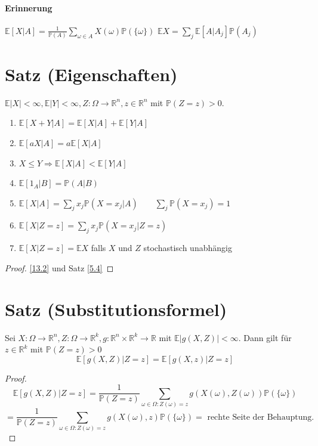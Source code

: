 \documentclass[a4paper,11pt,notitlepage]{report}
\newcommand{\R}{{\ensuremath{\mathbb{R}}}}
\newcommand{\Prim}{{\ensuremath{\mathbb{P}}}}
\newcommand{\E}{{\ensuremath{\mathbb{E}}}}
\begin{document}
\paragraph{Erinnerung}
$\E [X | A] = \frac{1}{\Prim(A)} \sum\limits_{\omega \in A}{X(\omega) \Prim(\{\omega\})}$
\newline
$\E X = \sum\limits_{j}{\E [A|A_j] \Prim(A_j)}$

\section{Satz (Eigenschaften)}
\label{13.6}
$\E |X| < \infty, \E |Y| < \infty, Z \colon \Omega \rightarrow \R^n, z \in \R^n$ mit $\Prim(Z=z)>0$.
\begin{enumerate}
	\item $\E [X+Y | A] = \E [X|A] + \E[Y | A]$
	\item $\E [aX | A] = a \E [X|A]$
	\item $X \leq Y \Rightarrow \E [X|A] < \E [Y|A]$
	\item $\E [1_A | B] = \Prim(A|B)$
	\item $\E [X| A] = \sum\limits_{j}{x_j \Prim(X= x_j | A)} \qquad \sum\limits_{j}{\Prim(X=x_j)}=1$
	\item $\E [X | Z=z] = \sum\limits_j{x_j \Prim(X=x_j | Z=z)}$
	\item $\E [X| Z=z] = \E X$ falls $X$ und $Z$ stochastisch unabhängig
\end{enumerate}

\begin{proof}
\ref{13.2} und Satz \ref{5.4}
\end{proof}

\section{Satz (Substitutionsformel)}
Sei $X \colon \Omega \rightarrow \R^n, Z \colon \Omega \rightarrow \R^k, g \colon \R^n \times \R^k \rightarrow \R$ mit $\E |g(X,Z)| < \infty$. Dann gilt für $z \in \R^k$ mit $\Prim(Z=z)>0$
$$\E [g(X,Z)| Z = z ] = \E [g(X,z) | Z=z]$$

\begin{proof}
	$$\E [g(X,Z)| Z = z ] = \frac{1}{\Prim(Z=z)} \sum\limits_{\omega \in \Omega \colon Z(\omega) = z}{g(X(\omega), Z(\omega)) \Prim(\{\omega\})}$$
	$$ = \frac{1}{\Prim(Z=z)} \sum\limits_{\omega \in \Omega \colon Z(\omega) = z}{g(X(\omega), z) \Prim(\{\omega\})} = \text{ rechte Seite der Behauptung.}$$
\end{proof}
\end{document}
